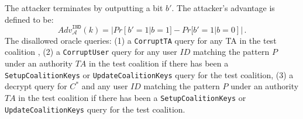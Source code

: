 \documentclass{llncs}
\newcommand{\A}{\mathcal{A}}
\newcommand{\ID}{\mathit{ID}}
\newcommand{\TA}{\mathit{TA}}
\newcommand{\adv}[2]{\mathit{Adv}_{#1}^{\tiny \texttt{#2}}}
\begin{document}
The attacker terminates by outputting a bit $b'$. The attacker's
advantage is defined to be:
\begin{displaymath}
\mathit{Adv}_{\A}^{\texttt{IND}}
(k) = |Pr[b'=1|b=1]-Pr[b'=1|b=0]| \, .
\end{displaymath}
The disallowed oracle queries: (1) a \texttt{CorruptTA} query for
any TA in the test coalition , (2) a \texttt{CorruptUser} query for
any user $\ID$ matching the pattern $\mathit{P}$ under an authority
$\TA$ in the test coalition if there has been a
\texttt{SetupCoalitionKeys} or \texttt{UpdateCoalitionKeys} query
for the test coalition, (3) a decrypt query for $C^{*}$ and any user
$\ID$ matching the pattern $\mathit{P}$ under an authority $\TA$ in
the test coalition if there has been a \texttt{SetupCoalitionKeys}
or \texttt{UpdateCoalitionKeys} query for the test coalition.



\end{document}
